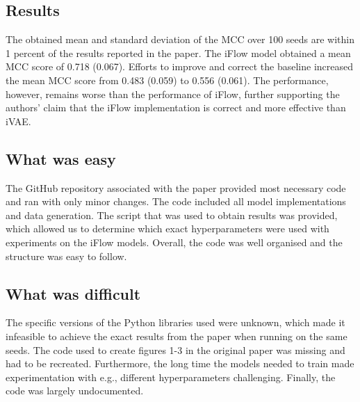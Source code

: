 \subsection*{Results}
The obtained mean and standard deviation of the MCC over 100 seeds are within 1 percent of the results reported in the paper.
The iFlow model obtained a mean MCC score of 0.718 (0.067). Efforts to improve and correct the baseline increased the mean MCC score from 0.483 (0.059) to 0.556 (0.061). The performance, however, remains worse than the performance of iFlow, further supporting the authors' claim that the iFlow implementation is correct and more effective than iVAE.

\subsection*{What was easy}
The GitHub repository associated with the paper provided most necessary code and ran with only minor changes. The code included all model implementations and data generation.
The script that was used to obtain results was provided, which allowed us to determine which exact hyperparameters were used with experiments on the iFlow models. Overall, the code was well organised and the structure was easy to follow.

\subsection*{What was difficult}
The specific versions of the Python libraries used were unknown, which made it infeasible to achieve the exact results from the paper when running on the same seeds.
The code used to create figures 1-3 in the original paper was missing and had to be recreated. Furthermore, the long time the models needed to train made experimentation with e.g., different hyperparameters challenging. Finally, the code was largely undocumented.

